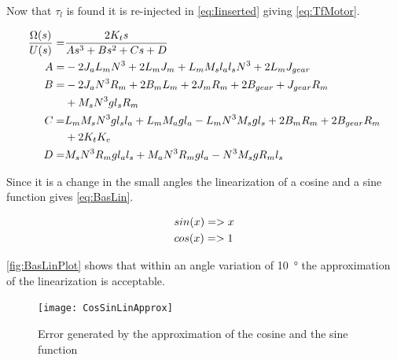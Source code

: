 Now that $\tau_l$ is found it is re-injected in \autoref{eq:Iinserted} giving \autoref{eq:TfMotor}.


\begin{subequations}\label{eq:TfMotor}
	\begin{align}
		\frac{\Omega(s)}{U(s)}=&\frac{2 K_t s}{A s^3+B s^2+C s+ D} \addunit{1}\\
		A=& -2 J_a L_m N^3+2 L_m J_m+L_m M_s l_a l_s N^3+2 L_m J_{gear}\\
		B=&-2 J_a N^3 R_m+2 B_m L_m+2 J_m R_m +2 B_{gear} + J_{gear} R_m \notag \\
		&+M_s N^3 g l_s R_m \\
		C=&L_m M_s N^3 g l_s l_a + L_m M_a g l_a - L_m N^3 M_s g l_s+2 B_m R_m+2 B_{gear} R_m \notag\\
		&+2 K_t K_e\\
		D=&M_s N^3 R_m g l_a l_s +M_a N^3 R_m g l_a -N^3 M_s g R_m l_s	
	\end{align}
\end{subequations}






Since it is a change in the small angles the linearization of a cosine and a sine function gives \autoref{eq:BasLin}.

\begin{subequations}\label{eq:BasLin}
	\begin{flalign}
		&sin(x)=>x \addunit{1}\\
		&cos(x)=>1 \addunit{1}
	\end{flalign}
\end{subequations}

\autoref{fig:BasLinPlot} shows that within an angle variation of \SI{10}{\degree} the approximation of the linearization is acceptable.

\begin{figure}[htbp]
	\centering
	\texttt{[image: CosSinLinApprox]}
	\caption{Error generated by the approximation of the cosine and the sine function}\label{fig:BasLinPlot}
\end{figure}

